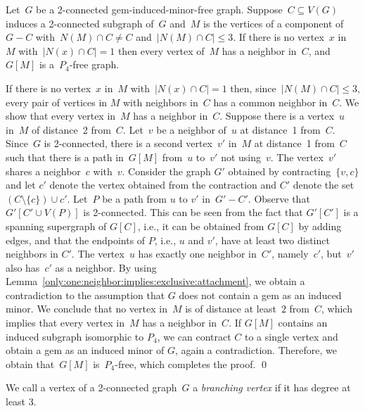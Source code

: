 \documentclass[envcountsame,envcountsect,11pt,a4paper]{llncs}
\renewenvironment{proof}{\begin{Proof}}{\qed\end{Proof}}
\begin{document}
\begin{lemma}
\label{lem:only:3:vertex:attached}
Let~$G$ be a 2-connected gem-induced-minor-free graph.
Suppose~$C\subseteq V(G)$ induces a 2-connected subgraph of~$G$
and~$M$ is the vertices of a component of~$G-C$ with~$N(M) \cap C \neq C$ and~$|N(M)\cap C|\leq 3$.
If there is no vertex~$x$ in~$M$ with~$|N(x)\cap C| = 1$ then every vertex of~$M$ has a neighbor in~$C$, and~$G[M]$ is a~$P_4$-free graph.
\end{lemma}
\begin{proof}
If there is no vertex~$x$ in~$M$ with~$|N(x)\cap C| = 1$
then, since~$|N(M)\cap C|\leq 3$, every pair of vertices in $M$ with neighbors in~$C$ has a common neighbor in~$C$. 
We show that every vertex in~$M$ has a neighbor in~$C$. Suppose there is a vertex~$u$ in~$M$ of distance~2 from~$C$. Let~$v$ be a neighbor
of~$u$ at distance~1 from~$C$. Since~$G$ is 2-connected, there is a second vertex~$v'$ in~$M$ at distance~1 from~$C$ such that there is a
path in~$G[M]$ from~$u$ to~$v'$ not using~$v$.
The vertex~$v'$ shares a neighbor~$c$ with~$v$. 
Consider the graph $G'$ obtained by contracting~$\{v,c\}$ and let $c'$ denote the vertex obtained from the contraction
and $C'$ denote the set $(C\setminus \{c\}) \cup c'$.
Let~$P$ be a path from $u$ to $v'$ in~$G'-C'$. Observe that $G'[C'\cup V(P)]$ is 2-connected. This can be seen from the fact that $G'[C']$ is a
spanning supergraph of $G[C]$, i.e., it can be obtained from $G[C]$ by adding edges, and that the endpoints of $P$, i.e., $u$ and $v'$, have
at least two distinct neighbors in $C'$.
The vertex~$u$ has exactly one neighbor in~$C'$, namely~$c'$, but~$v'$ also has~$c'$ as a neighbor.
By using Lemma~\ref{only:one:neighbor:implies:exclusive:attachment},
we obtain a contradiction to the assumption that $G$ does not contain a gem as
an induced minor. We conclude that no vertex in~$M$ is of distance at least~$2$ from~$C$, which implies that every vertex in~$M$ has a
neighbor in~$C$. If $G[M]$ contains an induced subgraph isomorphic to $P_4$, we can contract $C$ to a single vertex and obtain a gem as an
induced minor of $G$, again a contradiction. Therefore, we obtain that~$G[M]$ is~$P_4$-free, which completes the proof.
\end{proof}

We call a vertex of a 2-connected graph~$G$ a \emph{branching vertex} if it has degree at least 3.
\end{document}
